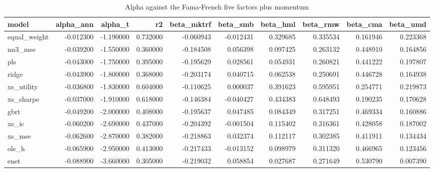 \begin{table}
\caption{Alpha against the Fama-French five factors plus momentum}
\label{tab:t5_alpha}
\begin{tabular}{lrrrrrrrrr}
\toprule
model & alpha\_ann & alpha\_t & r2 & beta\_mktrf & beta\_smb & beta\_hml & beta\_rmw & beta\_cma & beta\_umd \\
\midrule
equal\_weight & -0.012300 & -1.190000 & 0.732000 & -0.060943 & -0.012431 & 0.329685 & 0.335534 & 0.161946 & 0.223368 \\
nn3\_mse & -0.039200 & -1.550000 & 0.360000 & -0.184508 & 0.056398 & 0.097425 & 0.263132 & 0.448910 & 0.164856 \\
pls & -0.043000 & -1.750000 & 0.395000 & -0.195629 & 0.028561 & 0.054931 & 0.260821 & 0.441222 & 0.197807 \\
ridge & -0.043900 & -1.800000 & 0.368000 & -0.203174 & 0.040715 & 0.062538 & 0.250691 & 0.446728 & 0.164938 \\
xs\_utility & -0.036800 & -1.830000 & 0.604000 & -0.110625 & 0.000037 & 0.391623 & 0.595951 & 0.254771 & 0.219873 \\
xs\_sharpe & -0.037000 & -1.910000 & 0.618000 & -0.146384 & -0.040427 & 0.434383 & 0.648493 & 0.190235 & 0.170628 \\
gbrt & -0.049200 & -2.000000 & 0.408000 & -0.195637 & 0.047485 & 0.084349 & 0.317251 & 0.469334 & 0.160886 \\
xs\_ic & -0.060200 & -2.690000 & 0.437000 & -0.204392 & -0.001504 & 0.115402 & 0.316361 & 0.428058 & 0.187002 \\
xs\_mse & -0.062600 & -2.870000 & 0.382000 & -0.218863 & 0.032374 & 0.112117 & 0.302385 & 0.411911 & 0.134434 \\
ols\_h & -0.065900 & -2.950000 & 0.413000 & -0.217433 & -0.013152 & 0.098979 & 0.311320 & 0.466965 & 0.123456 \\
enet & -0.088900 & -3.660000 & 0.305000 & -0.219032 & 0.058854 & 0.027687 & 0.271649 & 0.530790 & 0.007390 \\
\bottomrule
\end{tabular}
\end{table}
